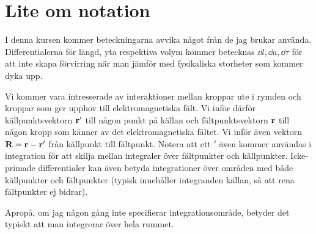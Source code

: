 \section{Lite om notation}

I denna kursen kommer beteckningarna avvika något från de jag brukar använda. Differentialerna för längd, yta respektiva volym kommer betecknas $\dd{l}, \dd{a}, \dd{\tau}$ för att inte skapa förvirring när man jämför med fysikaliska storheter som kommer dyka upp.

Vi kommer vara intresserade av interaktioner mellan kroppar ute i rymden och kroppar som ger upphov till elektromagnetiska fält. Vi inför därför källpunktsvektorn $\vb{r}'$ till någon punkt på källan och fältpunktsvektorn $\vb{r}$ till någon kropp som känner av det elektromagnetiska fältet. Vi inför även vektorn $\vb{R} = \vb{r} - \vb{r}'$ från källpunkt till fältpunkt. Notera att ett $'$ även kommer användas i integration för att skilja mellan integraler över fältpunkter och källpunkter. Icke-primade differentialer kan även betyda integrationer över områden med både källpunkter och fältpunkter (typisk innehåller integranden källan, så att rena fältpunkter ej bidrar).

Apropå, om jag någon gång inte specifierar integrationsområde, betyder det typiskt att man integrerar över hela rummet.